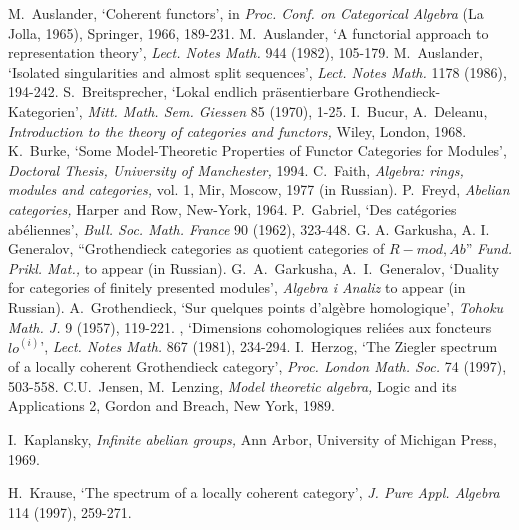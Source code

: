\documentclass[12pt]{article}
\theoremstyle{plain}
\theoremstyle{definition}
\numberwithin{equation}{section}
\begin{document}
\begin{thebibliography}{99}
 {\sc M.~Auslander}, `Coherent functors', in {\em Proc. Conf. on
                  Categorical Algebra\/} (La Jolla, 1965), Springer, 1966, 189-231.
 {\sc M.~Auslander}, `A functorial approach to
                  representation theory', {\em Lect. Notes Math.} 944 (1982), 105-179.
 {\sc M.~Auslander}, `Isolated singularities
                  and almost split sequences', {\em Lect. Notes Math.} 1178 (1986), 194-242.
 {\sc S.~Breitsprecher}, `Lokal endlich pr\"asentierbare
                  Grothendieck-Kategorien', {\em Mitt. Math. Sem. Giessen\/} 85 (1970), 1-25.
 {\sc I.~Bucur, A.~Deleanu}, {\em Introduction to the theory
                  of categories and functors,} Wiley, London, 1968.
 {\sc K.~Burke}, `Some Model-Theoretic Properties of Functor
                  Categories for Modules', {\em Doctoral Thesis, University of
                  Manchester,} 1994.
 {\sc C.~Faith}, {\em Algebra: rings, modules and categories,} vol. 1,
                  Mir, Moscow, 1977 (in Russian).
 {\sc P.~Freyd}, {\em Abelian categories,} Harper and Row,
                  New-York, 1964.
 {\sc P.~Gabriel}, `Des cat\'egories ab\'eliennes',
                  {\em Bull. Soc. Math. France\/} 90 (1962), 323-448.
{\sc G. A. Garkusha, A. I. Generalov}, ``Grothendieck categories as quotient categories of $R-mod,Ab$'' 
{\em Fund. Prikl. Mat.,} to appear (in Russian).
 {\sc G.~A.~Garkusha, A.~I.~Generalov}, `Duality for categories of finitely presented modules', {\em Algebra i Analiz} to appear (in Russian).
 {\sc A.~Grothendieck}, `Sur quelques points d'alg\`ebre homologique', {\em Tohoku Math. J.} 9 (1957), 119-221.
, `Dimensions cohomologiques            reli\'ees aux foncteurs ${lo}^{(i)}$', {\em Lect. Notes Math.} 867 (1981), 234-294.
 {\sc I.~Herzog}, `The Ziegler spectrum of a locally coherent Grothendieck category', {\em Proc. London Math. Soc.} 74 (1997), 503-558.
{\sc C.U.~Jensen, M.~Lenzing}, {\em Model theoretic algebra,}
Logic and its Applications 2, Gordon and Breach, New York, 1989.

{\sc I.~Kaplansky}, {\em Infinite abelian groups,} Ann Arbor, University of Michigan Press, 1969.

 {\sc H.~Krause}, `The spectrum of a locally coherent category', {\em J. Pure Appl. Algebra\/} 114 (1997), 259-271.


\end{thebibliography}
\end{document}
